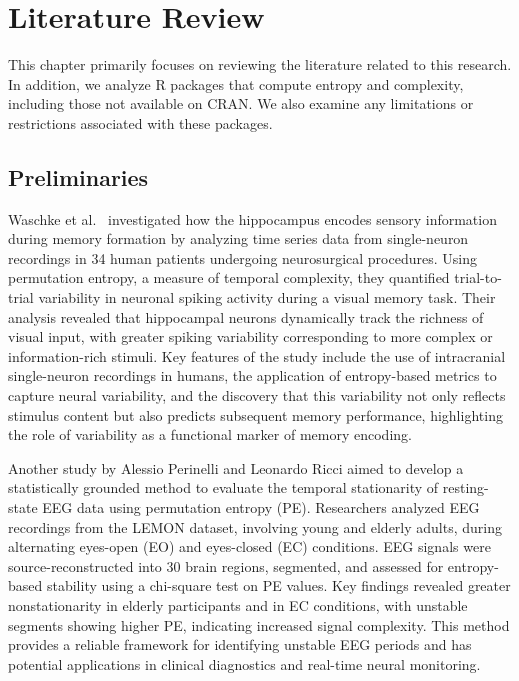 \chapter{Literature Review}\label{C:lit}

This chapter primarily focuses on reviewing the literature related to this research. In addition, we analyze R packages that compute entropy and complexity, including those not available on CRAN. We also examine any limitations or restrictions associated with these packages.

\section{Preliminaries}

Waschke et al.~\cite{Waschke2025} investigated how the hippocampus encodes sensory information during memory formation by analyzing time series data from single-neuron recordings in 34 human patients undergoing neurosurgical procedures. Using permutation entropy, a measure of temporal complexity, they quantified trial-to-trial variability in neuronal spiking activity during a visual memory task. Their analysis revealed that hippocampal neurons dynamically track the richness of visual input, with greater spiking variability corresponding to more complex or information-rich stimuli. Key features of the study include the use of intracranial single-neuron recordings in humans, the application of entropy-based metrics to capture neural variability, and the discovery that this variability not only reflects stimulus content but also predicts subsequent memory performance, highlighting the role of variability as a functional marker of memory encoding. 

Another study by Alessio Perinelli and Leonardo Ricci \cite{Perinelli2025} aimed to develop a statistically grounded method to evaluate the temporal stationarity of resting-state EEG data using permutation entropy (PE). Researchers analyzed EEG recordings from the LEMON dataset, involving young and elderly adults, during alternating eyes-open (EO) and eyes-closed (EC) conditions. EEG signals were source-reconstructed into 30 brain regions, segmented, and assessed for entropy-based stability using a chi-square test on PE values. Key findings revealed greater nonstationarity in elderly participants and in EC conditions, with unstable segments showing higher PE, indicating increased signal complexity. This method provides a reliable framework for identifying unstable EEG periods and has potential applications in clinical diagnostics and real-time neural monitoring.

